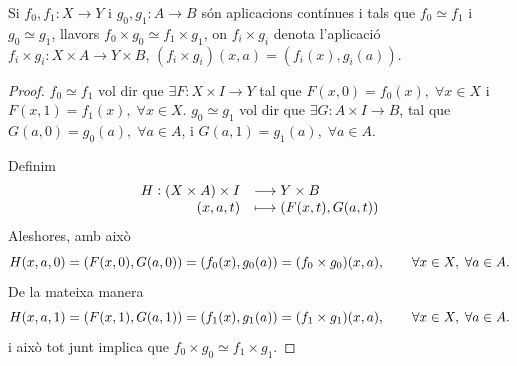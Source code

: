 \documentclass[../main.tex]{subfiles}
\begin{document}
\begin{prop}
[Exercici 3a]\label{exercici1.3.a} Si $f_0,f_1:X\rightarrow Y$ i $g_0,g_1:A\rightarrow B$ són aplicacions contínues i tals que $f_0\simeq f_1$ i $g_0\simeq g_1$, llavors $f_0\times g_0\simeq f_1\times g_1$, on $f_i\times g_i$ denota l'aplicació $f_i\times g_i:X\times A \rightarrow Y\times B$, $(f_i\times g_i)(x,a) = (f_i(x),g_i(a))$.
\end{prop}
\begin{proof}
$f_0\simeq f_1$ vol dir que $\exists F:X\times I\rightarrow Y$ tal que $F(x,0) = f_0(x),\;\forall x\in X$ i $F(x,1) = f_1(x),\;\forall x\in X$. $g_0\simeq g_1$ vol dir que $\exists G:A\times I\rightarrow B$, tal que $G(a,0) =g_0(a),\;\forall a\in A$, i $G(a,1) = g_1(a),\;\forall a\in A$.

Definim
\begin{equation}
    \notag
    \begin{array}{rl}
        H:(X\times A)\times I & \longrightarrow Y\times B \\
        (x,a,t) & \longmapsto (F(x,t),G(a,t))
    \end{array}
\end{equation}
Aleshores, amb això
\begin{equation}
    \notag
    H(x,a,0) = (F(x,0),G(a,0)) = (f_0(x),g_0(a)) = (f_0\times g_0)(x,a),\qquad \forall x\in X,\;\forall a\in A.
\end{equation}
De la mateixa manera
\begin{equation}
    \notag
    H(x,a,1) = (F(x,1),G(a,1)) = (f_1(x),g_1(a)) = (f_1\times g_1)(x,a),\qquad \forall x\in X,\;\forall a\in A.
\end{equation}
i això tot junt implica que $f_0\times g_0\simeq f_1\times g_1$.
\end{proof}
\end{document}
